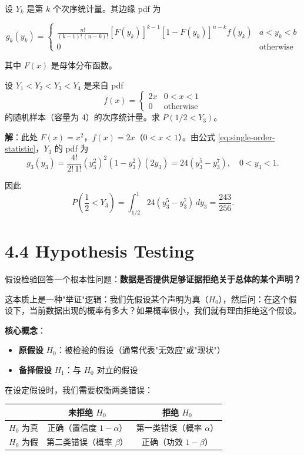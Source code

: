 设 $Y_k$ 是第 $k$ 个次序统计量。其边缘 pdf 为

\[
g_k(y_k) =
\begin{cases}
\frac{n!}{(k-1)!\,(n-k)!} [F(y_k)]^{k-1} [1-F(y_k)]^{n-k} f(y_k) & a < y_k < b \\
0 & \text{otherwise}
\end{cases}
\label{eq:single-order-statistic}
\]

其中 $F(x)$ 是母体分布函数。

\begin{example}[均匀分布次序统计量]\label{ex:uniform-order-statistic}
设 $Y_1 < Y_2 < Y_3 < Y_4$ 是来自 pdf
\[
f(x) =
\begin{cases}
2x & 0 < x < 1 \\
0 & \text{otherwise}
\end{cases}
\]
的随机样本（容量为 4）的次序统计量。求 $P(1/2 < Y_3)$。

\textbf{解}：此处 $F(x) = x^2$，$f(x) = 2x$（$0 < x < 1$）。由公式 \eqref{eq:single-order-statistic}，$Y_3$ 的 pdf 为
\[
g_3(y_3) = \frac{4!}{2!\,1!} (y_3^2)^2 (1-y_3^2)(2y_3) = 24(y_3^5 - y_3^7), \quad 0 < y_3 < 1.
\]

因此
\[
P\left(\frac{1}{2} < Y_3\right) = \int_{1/2}^1 24(y_3^5 - y_3^7) \, dy_3 = \frac{243}{256}.
\]
\end{example}

\section{4.4 Hypothesis Testing}\label{sec:4.4}

假设检验回答一个根本性问题：\textbf{数据是否提供足够证据拒绝关于总体的某个声明？}

这本质上是一种"举证"逻辑：我们先假设某个声明为真（$H_0$），然后问：在这个假设下，当前数据出现的概率有多大？如果概率很小，我们就有理由拒绝这个假设。

\textbf{核心概念}：
\begin{itemize}
\item \textbf{原假设} $H_0$：被检验的假设（通常代表"无效应"或"现状"）
\item \textbf{备择假设} $H_1$：与 $H_0$ 对立的假设
\end{itemize}

在设定假设时，我们需要权衡两类错误：

\begin{center}
\begin{tabular}{c|c|c}
 & 未拒绝 $H_0$ & 拒绝 $H_0$ \\ \hline
$H_0$ 为真 & 正确（置信度 $1-\alpha$） & 第一类错误（概率 $\alpha$） \\
$H_0$ 为假 & 第二类错误（概率 $\beta$） & 正确（功效 $1-\beta$）
\end{tabular}
\end{center}


